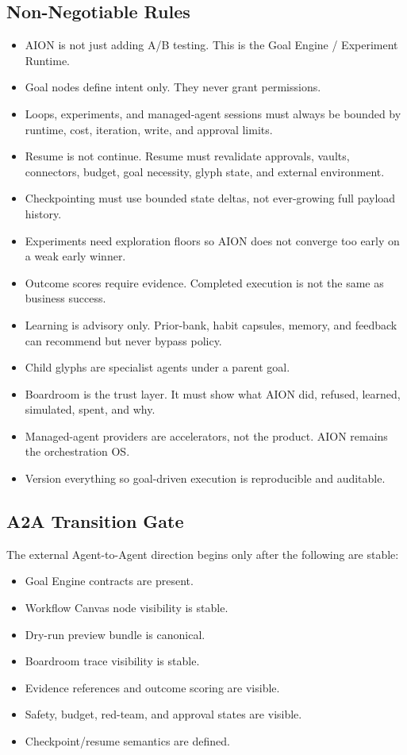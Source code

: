 \subsection{Non-Negotiable Rules}

\begin{itemize}
  \item AION is not just adding A/B testing. This is the Goal Engine / Experiment Runtime.
  \item Goal nodes define intent only. They never grant permissions.
  \item Loops, experiments, and managed-agent sessions must always be bounded by runtime, cost, iteration, write, and approval limits.
  \item Resume is not continue. Resume must revalidate approvals, vaults, connectors, budget, goal necessity, glyph state, and external environment.
  \item Checkpointing must use bounded state deltas, not ever-growing full payload history.
  \item Experiments need exploration floors so AION does not converge too early on a weak early winner.
  \item Outcome scores require evidence. Completed execution is not the same as business success.
  \item Learning is advisory only. Prior-bank, habit capsules, memory, and feedback can recommend but never bypass policy.
  \item Child glyphs are specialist agents under a parent goal.
  \item Boardroom is the trust layer. It must show what AION did, refused, learned, simulated, spent, and why.
  \item Managed-agent providers are accelerators, not the product. AION remains the orchestration OS.
  \item Version everything so goal-driven execution is reproducible and auditable.
\end{itemize}

\subsection{A2A Transition Gate}

The external Agent-to-Agent direction begins only after the following are stable:

\begin{itemize}
  \item Goal Engine contracts are present.
  \item Workflow Canvas node visibility is stable.
  \item Dry-run preview bundle is canonical.
  \item Boardroom trace visibility is stable.
  \item Evidence references and outcome scoring are visible.
  \item Safety, budget, red-team, and approval states are visible.
  \item Checkpoint/resume semantics are defined.
\end{itemize}

